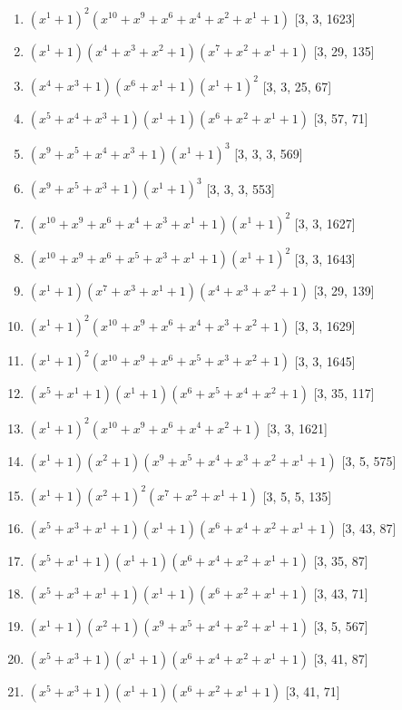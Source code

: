 \documentclass[10pt,twocolumn]{article}
\begin{document}
\begin{enumerate}
\item $(x^{1} + 1)^{2}(x^{10} + x^{9} + x^{6} + x^{4} + x^{2} + x^{1} + 1)$  [3, 3, 1623]
\item $(x^{1} + 1)(x^{4} + x^{3} + x^{2} + 1)(x^{7} + x^{2} + x^{1} + 1)$  [3, 29, 135]
\item $(x^{4} + x^{3} + 1)(x^{6} + x^{1} + 1)(x^{1} + 1)^{2}$  [3, 3, 25, 67]
\item $(x^{5} + x^{4} + x^{3} + 1)(x^{1} + 1)(x^{6} + x^{2} + x^{1} + 1)$  [3, 57, 71]
\item $(x^{9} + x^{5} + x^{4} + x^{3} + 1)(x^{1} + 1)^{3}$  [3, 3, 3, 569]
\item $(x^{9} + x^{5} + x^{3} + 1)(x^{1} + 1)^{3}$  [3, 3, 3, 553]
\item $(x^{10} + x^{9} + x^{6} + x^{4} + x^{3} + x^{1} + 1)(x^{1} + 1)^{2}$  [3, 3, 1627]
\item $(x^{10} + x^{9} + x^{6} + x^{5} + x^{3} + x^{1} + 1)(x^{1} + 1)^{2}$  [3, 3, 1643]
\item $(x^{1} + 1)(x^{7} + x^{3} + x^{1} + 1)(x^{4} + x^{3} + x^{2} + 1)$  [3, 29, 139]
\item $(x^{1} + 1)^{2}(x^{10} + x^{9} + x^{6} + x^{4} + x^{3} + x^{2} + 1)$  [3, 3, 1629]
\item $(x^{1} + 1)^{2}(x^{10} + x^{9} + x^{6} + x^{5} + x^{3} + x^{2} + 1)$  [3, 3, 1645]
\item $(x^{5} + x^{1} + 1)(x^{1} + 1)(x^{6} + x^{5} + x^{4} + x^{2} + 1)$  [3, 35, 117]
\item $(x^{1} + 1)^{2}(x^{10} + x^{9} + x^{6} + x^{4} + x^{2} + 1)$  [3, 3, 1621]
\item $(x^{1} + 1)(x^{2} + 1)(x^{9} + x^{5} + x^{4} + x^{3} + x^{2} + x^{1} + 1)$  [3, 5, 575]
\item $(x^{1} + 1)(x^{2} + 1)^{2}(x^{7} + x^{2} + x^{1} + 1)$  [3, 5, 5, 135]
\item $(x^{5} + x^{3} + x^{1} + 1)(x^{1} + 1)(x^{6} + x^{4} + x^{2} + x^{1} + 1)$  [3, 43, 87]
\item $(x^{5} + x^{1} + 1)(x^{1} + 1)(x^{6} + x^{4} + x^{2} + x^{1} + 1)$  [3, 35, 87]
\item $(x^{5} + x^{3} + x^{1} + 1)(x^{1} + 1)(x^{6} + x^{2} + x^{1} + 1)$  [3, 43, 71]
\item $(x^{1} + 1)(x^{2} + 1)(x^{9} + x^{5} + x^{4} + x^{2} + x^{1} + 1)$  [3, 5, 567]
\item $(x^{5} + x^{3} + 1)(x^{1} + 1)(x^{6} + x^{4} + x^{2} + x^{1} + 1)$  [3, 41, 87]
\item $(x^{5} + x^{3} + 1)(x^{1} + 1)(x^{6} + x^{2} + x^{1} + 1)$  [3, 41, 71]

\end{enumerate}
\end{document}
